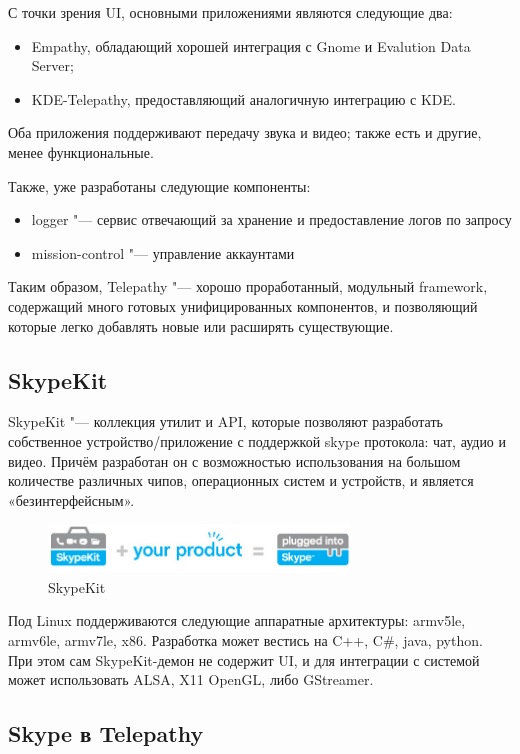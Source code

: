 \documentclass[10pt, a5paper]{article}
\begin{document}
С точки зрения UI, основными приложениями являются следующие два:
\begin{itemize}
\item Empathy, обладающий хорошей интеграция с Gnome и Evalution Data Server;
\item KDE-Telepathy, предоставляющий аналогичную интеграцию с KDE.
\end{itemize}

Оба приложения поддерживают передачу звука и видео; также есть и другие, менее функциональные.

Также, уже разработаны следующие компоненты:
\begin{itemize}
\item logger "--- сервис отвечающий за хранение и предоставление логов по запросу
\item mission-control "--- управление аккаунтами
\end{itemize}

Таким образом, Telepathy "--- хорошо проработанный, модульный framework, содержащий много готовых унифицированных компонентов, и позволяющий которые легко добавлять новые или расширять существующие.

\subsection*{SkypeKit}
SkypeKit "--- коллекция утилит и API, которые позволяют разработать собственное устройство/приложение с поддержкой skype протокола: чат, аудио и видео. Причём разработан он с возможностью использования на большом количестве различных чипов, операционных систем и устройств, и является «безинтерфейсным».
\begin{figure}[b]
  \centering
  \includegraphics[width=8cm]{101_2013_w_Melnikau_skypekit}
  \caption{SkypeKit}
\end{figure}
Под Linux поддерживаются следующие аппаратные архитектуры: armv5le,
armv6le, armv7le, x86. Разработка может вестись на C++, C\#, java, python. При этом сам SkypeKit-демон не содержит UI, и для интеграции с системой может использовать ALSA, X11 OpenGL, либо GStreamer.

\subsection*{Skype в Telepathy}
\end{document}
